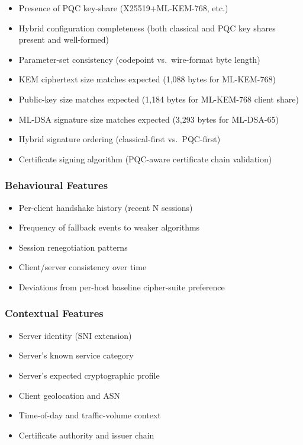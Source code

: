 \documentclass[sigconf,nonacm]{acmart}
\begin{document}
\begin{itemize}
  \item Presence of PQC key-share (X25519+ML-KEM-768, etc.)
  \item Hybrid configuration completeness (both classical and PQC
        key shares present and well-formed)
  \item Parameter-set consistency (codepoint vs.\ wire-format byte
        length)
  \item KEM ciphertext size matches expected (1{,}088 bytes for
        ML-KEM-768)
  \item Public-key size matches expected (1{,}184 bytes for
        ML-KEM-768 client share)
  \item ML-DSA signature size matches expected (3{,}293 bytes for
        ML-DSA-65)
  \item Hybrid signature ordering (classical-first vs.\ PQC-first)
  \item Certificate signing algorithm (PQC-aware certificate chain
        validation)
\end{itemize}

\subsubsection{Behavioural Features}

\begin{itemize}
  \item Per-client handshake history (recent N sessions)
  \item Frequency of fallback events to weaker algorithms
  \item Session renegotiation patterns
  \item Client/server consistency over time
  \item Deviations from per-host baseline cipher-suite preference
\end{itemize}

\subsubsection{Contextual Features}

\begin{itemize}
  \item Server identity (SNI extension)
  \item Server's known service category
  \item Server's expected cryptographic profile
  \item Client geolocation and ASN
  \item Time-of-day and traffic-volume context
  \item Certificate authority and issuer chain
\end{itemize}
\end{document}
